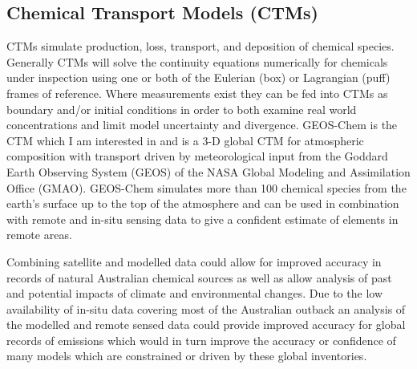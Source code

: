 \subsection{Chemical Transport Models (CTMs)}
CTMs simulate production, loss, transport, and deposition of chemical species.
Generally CTMs will solve the continuity equations numerically for chemicals under inspection using one or both of the Eulerian (box) or Lagrangian (puff) frames of reference.
Where measurements exist they can be fed into CTMs as boundary and/or initial conditions in order to both examine real world concentrations and limit model uncertainty and divergence.
GEOS-Chem is the CTM which I am interested in and is a 3-D global CTM for atmospheric composition with transport driven by meteorological input from the Goddard Earth Observing System (GEOS) of the NASA Global Modeling and Assimilation Office (GMAO).
GEOS-Chem simulates more than 100 chemical species from the earth's surface up to the top of the atmosphere and can be used in combination with remote and in-situ sensing data to give a confident estimate of elements in remote areas.

Combining satellite and modelled data could allow for improved accuracy in records of natural Australian chemical sources as well as allow analysis of past and potential impacts of climate and environmental changes.
Due to the low availability of in-situ data covering most of the Australian outback an analysis of the modelled and remote sensed data could provide improved accuracy for global records of emissions which would in turn improve the accuracy or confidence of many models which are constrained or driven by these global inventories.

